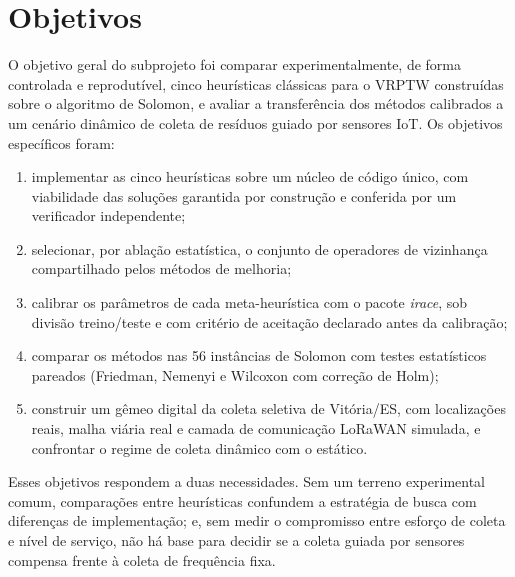 \documentclass[10pt,a4paper]{article}
\begin{document}
\section{Objetivos}
O objetivo geral do subprojeto foi comparar experimentalmente, de forma controlada e reprodutível, cinco heurísticas clássicas para o VRPTW construídas sobre o algoritmo de Solomon, e avaliar a transferência dos métodos calibrados a um cenário dinâmico de coleta de resíduos guiado por sensores IoT. Os objetivos específicos foram:
\begin{enumerate}
  \item implementar as cinco heurísticas sobre um núcleo de código único, com viabilidade das soluções garantida por construção e conferida por um verificador independente;
  \item selecionar, por ablação estatística, o conjunto de operadores de vizinhança compartilhado pelos métodos de melhoria;
  \item calibrar os parâmetros de cada meta-heurística com o pacote \textit{irace}, sob divisão treino/teste e com critério de aceitação declarado antes da calibração;
  \item comparar os métodos nas 56 instâncias de Solomon com testes estatísticos pareados (Friedman, Nemenyi e Wilcoxon com correção de Holm);
  \item construir um gêmeo digital da coleta seletiva de Vitória/ES, com localizações reais, malha viária real e camada de comunicação LoRaWAN simulada, e confrontar o regime de coleta dinâmico com o estático.
\end{enumerate}

\vspace{\baselineskip}
Esses objetivos respondem a duas necessidades. Sem um terreno experimental comum, comparações entre heurísticas confundem a estratégia de busca com diferenças de implementação; e, sem medir o compromisso entre esforço de coleta e nível de serviço, não há base para decidir se a coleta guiada por sensores compensa frente à coleta de frequência fixa.

\end{document}
